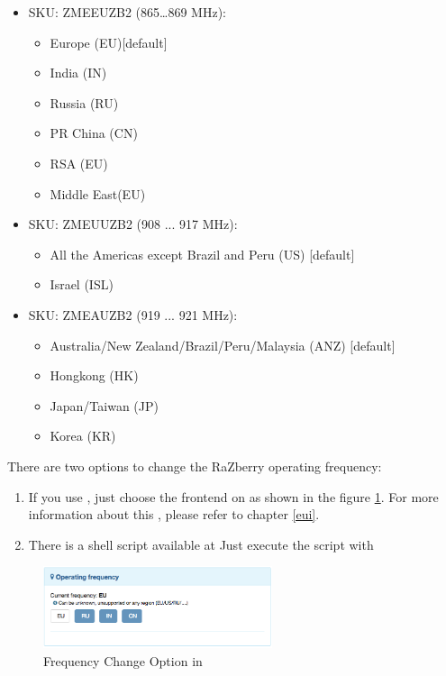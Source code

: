 \begin{itemize}
\item SKU: ZMEEUZB2 (865…869 MHz):
\begin{itemize}
\item Europe (EU)[default]
\item India (IN)
\item Russia (RU)
\item PR China (CN)
\item RSA (EU)
\item Middle East(EU)
\end{itemize}
\item SKU: ZMEUUZB2 (908 ... 917 MHz):
\begin{itemize}
\item All the Americas except Brazil and Peru (US) [default]
\item Israel (ISL)
\end{itemize}
\item SKU: ZMEAUZB2 (919 ... 921 MHz):
\begin{itemize}
\item Australia/New Zealand/Brazil/Peru/Malaysia (ANZ) [default]
\item Hongkong (HK)
\item Japan/Taiwan (JP)
\item Korea (KR)
\end{itemize}
\end{itemize}

There are two options to change the RaZberry operating frequency:

\begin{enumerate}
\item If you use \zweui, just choose the frontend on  as shown in 
the figure \ref{freqchange}. For more information about this \zweui, please refer to chapter \ref{eui}.
\item There is a shell script available at
Just execute the script with
\begin{quote}
\end{quote}
\end{enumerate}

\begin{figure}
\begin{center}
\includegraphics[width=0.6\textwidth]{pngs/cap2/freqchange.png}
\caption{Frequency Change Option in \zweui}
\label{freqchange}
\end{center}
\end{figure}

